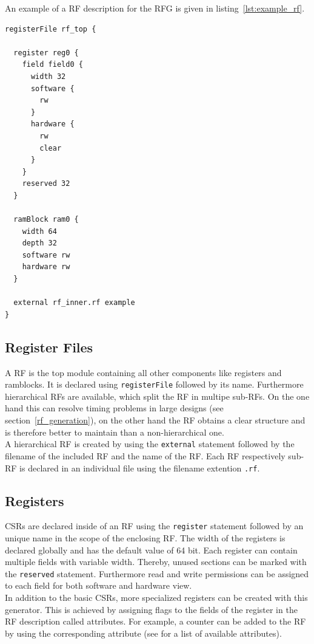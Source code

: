 An example of a RF description for the RFG is given in listing~\ref{lst:example_rf}.

\begin{lstlisting}[frame=single,
caption={Example RF description},
basicstyle=\small\ttfamily,
label={lst:example_rf}]
registerFile rf_top {

  register reg0 {
    field field0 {
      width 32
      software {
        rw
      }
      hardware {
        rw
        clear
      }
    }
    reserved 32
  }
	
  ramBlock ram0 {
    width 64
    depth 32
    software rw
    hardware rw
  }
	
  external rf_inner.rf example
}
\end{lstlisting}
\subsection{Register Files}
A RF is the top module containing all other components like registers and ramblocks. It is declared using \lstinline$registerFile$ followed by its name.
Furthermore hierarchical RFs are available, which split the RF in multipe sub-RFs. On the one hand this can resolve timing problems in large designs (see section~\ref{rf_generation}), on the other hand the RF obtains a clear structure and is therefore better to maintain than a non-hierarchical one.\\
A hierarchical RF is created by using the \lstinline$external$ statement followed by the filename of the included RF and the name of the RF. Each RF respectively sub-RF is declared in an individual file using the filename extention \lstinline$.rf$.
\subsection{Registers}
CSRs are declared inside of an RF using the \lstinline$register$ statement followed by an unique name in the scope of the enclosing RF. The width of the registers is declared globally and has the default value of 64 bit. Each register can contain multiple fields with variable width. Thereby, unused sections can be marked with the \lstinline$reserved$ statement. Furthermore read and write permissions can be assigned to each field for both software and hardware view.\\
In addition to the basic CSRs, more specialized registers can be created with this generator. This is achieved by assigning flags to the fields of the register in the RF description called attributes. For example, a counter can be added to the RF by using the corresponding attribute (see \cite{rfg_spec} for a list of available attributes).
